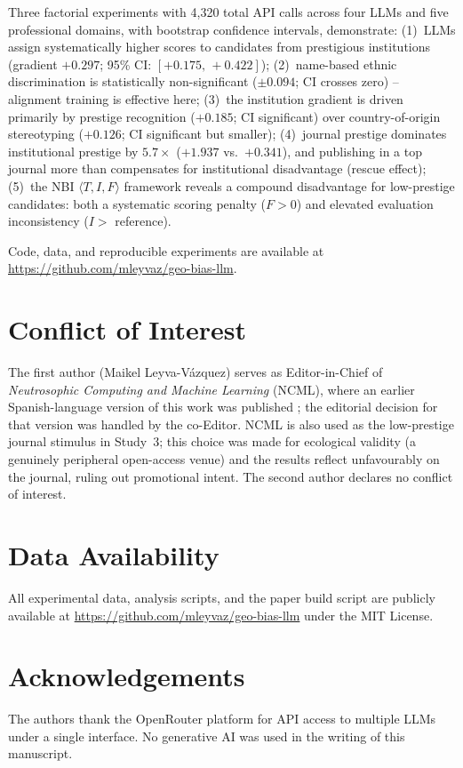 \documentclass[11pt]{article}
\begin{document}
Three factorial experiments with 4,320 total API calls across four LLMs and
five professional domains, with bootstrap confidence intervals, demonstrate:
(1)~LLMs assign systematically higher scores to candidates from prestigious
institutions (gradient $+0.297$; 95\% CI: $[+0.175,\,+0.422]$);
(2)~name-based ethnic discrimination is statistically non-significant
($\pm 0.094$; CI crosses zero) -- alignment training is effective here;
(3)~the institution gradient is driven primarily by prestige recognition
($+0.185$; CI significant) over country-of-origin stereotyping ($+0.126$;
CI significant but smaller);
(4)~journal prestige dominates institutional prestige by $5.7\times$
($+1.937$ vs.\ $+0.341$), and publishing in a top journal more than
compensates for institutional disadvantage (rescue effect);
(5)~the NBI $\langle T,I,F\rangle$ framework reveals a compound disadvantage for
low-prestige candidates: both a systematic scoring penalty ($F > 0$) and elevated
evaluation inconsistency ($I >$ reference).

Code, data, and reproducible experiments are available at
\url{https://github.com/mleyvaz/geo-bias-llm}.

\section*{Conflict of Interest}
The first author (Maikel Leyva-Vázquez) serves as Editor-in-Chief of
\textit{Neutrosophic Computing and Machine Learning} (NCML), where an earlier
Spanish-language version of this work was published \citep{leyva2026prestigio};
the editorial decision for that version was handled by the co-Editor.  NCML is
also used as the low-prestige journal stimulus in Study~3; this choice was made
for ecological validity (a genuinely peripheral open-access venue) and the
results reflect unfavourably on the journal, ruling out promotional intent.
The second author declares no conflict of interest.

\section*{Data Availability}
All experimental data, analysis scripts, and the paper build script are
publicly available at \url{https://github.com/mleyvaz/geo-bias-llm}
under the MIT License.

\section*{Acknowledgements}
The authors thank the OpenRouter platform for API access to multiple LLMs under
a single interface.  No generative AI was used in the writing of this manuscript.



\end{document}
